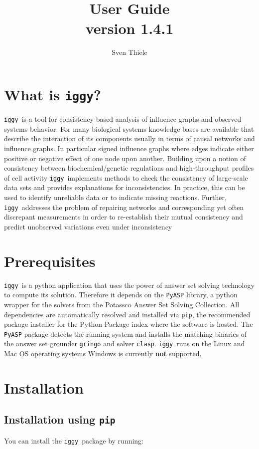 \documentclass{article}
\title{ \iggy  \\
User Guide \\
version 1.4.1
}
\author{Sven Thiele}
\date{}
\newcommand\iggy{\texttt{iggy}}
\begin{document}
\maketitle


\section{What is \iggy?}

\iggy\ is a tool for consistency based analysis of influence graphs and observed systems behavior.
For many biological systems knowledge bases are available that describe the interaction of its components 
 usually in terms of causal networks and influence graphs. 
In particular signed influence graphs where edges indicate either positive or negative effect of one node upon another.
Building upon a notion of consistency between biochemical/genetic regulations and high-throughput profiles of cell activity
\iggy\ implements methods to check the consistency of large-scale data sets and
 provides explanations for inconsistencies. 
In practice, this can be used to identify unreliable data or to indicate missing reactions. 
Further, \iggy\ addresses the problem of repairing networks and corresponding yet often discrepant measurements
in order to re-establish their mutual consistency and predict unobserved variations even under inconsistency
 
\section{Prerequisites} 
\iggy\ is a python application that uses the power of answer set solving technology to compute its solution.
Therefore it depends on the \texttt{PyASP} library, a python wrapper for the solvers from the Potassco Answer Set Solving Collection.
All dependencies are automatically resolved and installed via \texttt{pip}, the recommended package installer for the Python Package index where the software is hosted.
The \texttt{PyASP} package detects the running system and installs the matching binaries of the answer set grounder \texttt{gringo} and solver \texttt{clasp}.
\iggy\ runs on the Linux and Mac OS operating systems Windows is currently {\bf not} supported.
 
 
\section{Installation}

\subsection{Installation using \texttt{pip}}
You can install the \iggy\ package by running:
\end{document}
